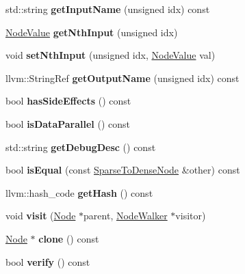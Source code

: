 \begin{DoxyCompactItemize}
std\+::string {\bfseries get\+Input\+Name} (unsigned idx) const
\item 
\mbox{\label{classglow_1_1_sparse_to_dense_node_a13224c8c2a733d98cc2f6931c77ec478}} 
\hyperlink{structglow_1_1_node_value}{Node\+Value} {\bfseries get\+Nth\+Input} (unsigned idx)
\item 
\mbox{\label{classglow_1_1_sparse_to_dense_node_a1946b574a0417b8855ee18547219b8a1}} 
void {\bfseries set\+Nth\+Input} (unsigned idx, \hyperlink{structglow_1_1_node_value}{Node\+Value} val)
\item 
\mbox{\label{classglow_1_1_sparse_to_dense_node_a04b286d8ec54c513a0e9c766f959def3}} 
llvm\+::\+String\+Ref {\bfseries get\+Output\+Name} (unsigned idx) const
\item 
\mbox{\label{classglow_1_1_sparse_to_dense_node_a35e810f50c3c5cd42c6f7277fa224431}} 
bool {\bfseries has\+Side\+Effects} () const
\item 
\mbox{\label{classglow_1_1_sparse_to_dense_node_a2da2981e620d0f5e48d5734432cc7710}} 
bool {\bfseries is\+Data\+Parallel} () const
\item 
\mbox{\label{classglow_1_1_sparse_to_dense_node_af04fee08f8c9fd920e21326a46a9264f}} 
std\+::string {\bfseries get\+Debug\+Desc} () const
\item 
\mbox{\label{classglow_1_1_sparse_to_dense_node_abc232df565b4c6e269dbeebbc7ff7e51}} 
bool {\bfseries is\+Equal} (const \hyperlink{classglow_1_1_sparse_to_dense_node}{Sparse\+To\+Dense\+Node} \&other) const
\item 
\mbox{\label{classglow_1_1_sparse_to_dense_node_a18e0205cf44555df4d99aaf3f192331d}} 
llvm\+::hash\+\_\+code {\bfseries get\+Hash} () const
\item 
\mbox{\label{classglow_1_1_sparse_to_dense_node_a6562532d8402e39eeababdf69af10fbc}} 
void {\bfseries visit} (\hyperlink{classglow_1_1_node}{Node} $\ast$parent, \hyperlink{classglow_1_1_node_walker}{Node\+Walker} $\ast$visitor)
\item 
\mbox{\label{classglow_1_1_sparse_to_dense_node_a24d59ac29e86e679c7182897157b7761}} 
\hyperlink{classglow_1_1_node}{Node} $\ast$ {\bfseries clone} () const
\item 
\mbox{\label{classglow_1_1_sparse_to_dense_node_a6ea76821a0e1a83f0dc501974fe62061}} 
bool {\bfseries verify} () const
\end{DoxyCompactItemize}
